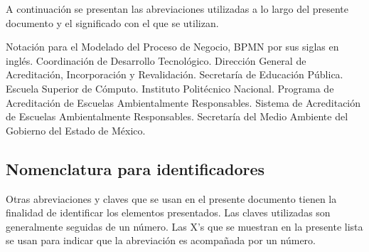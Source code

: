 	A continuación se presentan las abreviaciones utilizadas a lo largo del presente documento y el significado con el que se utilizan.

	\begin{description}
	     Notación para el Modelado del Proceso de Negocio, BPMN por sus siglas en inglés.
	     Coordinación de Desarrollo Tecnológico.
	     Dirección General de Acreditación, Incorporación y Revalidación.
	     Secretaría de Educación Pública.
	     Escuela Superior de Cómputo.
	     Instituto Politécnico Nacional.
	     Programa de Acreditación de Escuelas Ambientalmente Responsables.
	     Sistema de Acreditación de Escuelas Ambientalmente Responsables.
	     Secretaría del Medio Ambiente del Gobierno del Estado de México.
	\end{description}

    \subsection{Nomenclatura para identificadores}

	Otras abreviaciones y claves que se usan en el presente documento tienen la finalidad de identificar los elementos presentados. Las claves utilizadas son generalmente seguidas de un número. Las X’s que se muestran en la presente lista se usan para indicar que la abreviación es acompañada por un número.

